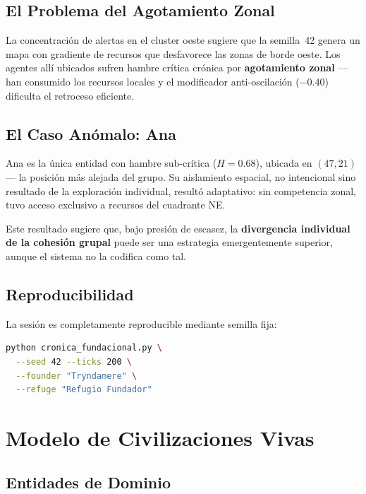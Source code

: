 \documentclass[11pt,a4paper,twocolumn]{article}
\begin{document}
\subsection{El Problema del Agotamiento Zonal}

La concentraci\'on de alertas en el cluster oeste sugiere que la
semilla~42 genera un mapa con gradiente de recursos que desfavorece
las zonas de borde oeste. Los agentes all\'i ubicados sufren hambre
cr\'itica cr\'onica por \textbf{agotamiento zonal} --- han consumido
los recursos locales y el modificador anti-oscilaci\'on ($-0.40$)
dificulta el retroceso eficiente.

\subsection{El Caso An\'omalo: Ana}

Ana es la \'unica entidad con hambre sub-cr\'itica ($H=0.68$), ubicada
en $(47,21)$ --- la posici\'on m\'as alejada del grupo. Su aislamiento
espacial, no intencional sino resultado de la exploraci\'on individual,
result\'o adaptativo: sin competencia zonal, tuvo acceso exclusivo a
recursos del cuadrante NE.

Este resultado sugiere que, bajo presi\'on de escasez, la
\textbf{divergencia individual de la cohesi\'on grupal} puede ser una
estrategia emergentemente superior, aunque el sistema no la codifica
como tal.

\subsection{Reproducibilidad}

La sesi\'on es completamente reproducible mediante semilla fija:

\begin{lstlisting}[language=bash, caption={Comando de reproducci\'on}]
python cronica_fundacional.py \
  --seed 42 --ticks 200 \
  --founder "Tryndamere" \
  --refuge "Refugio Fundador"
\end{lstlisting}

\section{Modelo de Civilizaciones Vivas}

\subsection{Entidades de Dominio}
\end{document}
